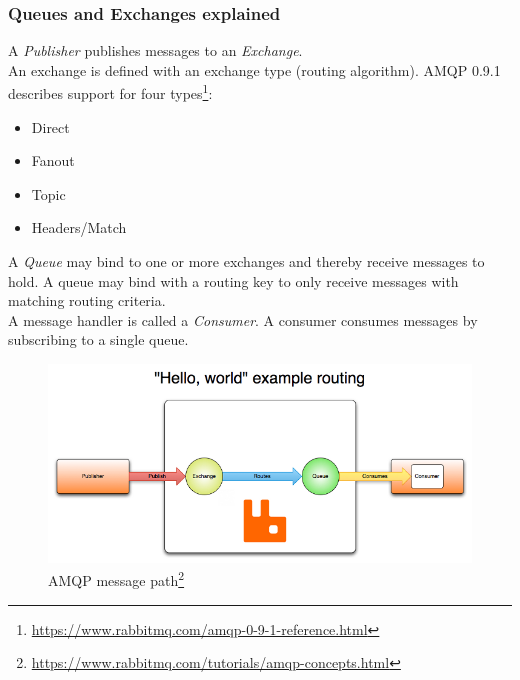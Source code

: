 \subsubsection{Queues and Exchanges explained}
A \textit{Publisher} publishes messages to an \textit{Exchange}.\\
An exchange is defined with an exchange type (routing algorithm). AMQP 0.9.1 describes support for four types\footnote{\url{https://www.rabbitmq.com/amqp-0-9-1-reference.html}}:
\begin{itemize}
\item Direct
\item Fanout
\item Topic
\item Headers/Match
\end{itemize}
A \textit{Queue} may bind to one or more exchanges and thereby receive messages to hold. A queue may bind with a routing key to only receive messages with matching routing criteria.\\
A message handler is called a \textit{Consumer}. A consumer consumes messages by subscribing to a single queue.
\begin{figure}[H]
  \includegraphics[width=\textwidth]{illustrations/publisher-exchange-queue-consumer.png}
  \caption{AMQP message path\footnote{\url{https://www.rabbitmq.com/tutorials/amqp-concepts.html}}}
\end{figure}
\newpage